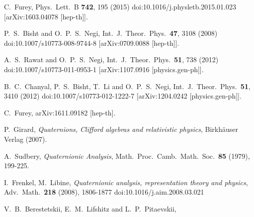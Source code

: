 \documentclass[epsfig,12pt]{article}
\begin{document}
\begin{thebibliography}{99}
  C.~Furey,
  Phys.\ Lett.\ B {\bf 742}, 195 (2015)
  doi:10.1016/j.physletb.2015.01.023
  [arXiv:1603.04078 [hep-th]].

  P.~S.~Bisht and O.~P.~S.~Negi,
  Int.\ J.\ Theor.\ Phys.\  {\bf 47}, 3108 (2008)
  doi:10.1007/s10773-008-9744-8
  [arXiv:0709.0088 [hep-th]].

  A.~S.~Rawat and O.~P.~S.~Negi,
  Int.\ J.\ Theor.\ Phys.\  {\bf 51}, 738 (2012)
  doi:10.1007/s10773-011-0953-1
  [arXiv:1107.0916 [physics.gen-ph]].

  B.~C.~Chanyal, P.~S.~Bisht, T.~Li and O.~P.~S.~Negi,
  Int.\ J.\ Theor.\ Phys.\  {\bf 51}, 3410 (2012)
  doi:10.1007/s10773-012-1222-7
  [arXiv:1204.0242 [physics.gen-ph]].

  C.~Furey,
  arXiv:1611.09182 [hep-th].

  P.~Girard,
  {\it Quaternions, Clifford algebras and relativistic physics},
  Birkh\"auser Verlag (2007).

  A.~Sudbery,
  {\it Quaternionic Analysis},
  Math.\ Proc.\ Camb.\ Math.\ Soc.\  {\bf 85} (1979), 199-225.

  I.~Frenkel, M.~Libine,
  {\it Quaternionic analysis, representation theory and physics},
  Adv.\ Math.\  {\bf 218} (2008), 1806-1877
  doi:10.1016/j.aim.2008.03.021

  V.~B.~Berestetskii, E.~M.~Lifshitz and L.~P.~Pitaevskii,
\end{thebibliography}
\end{document}
